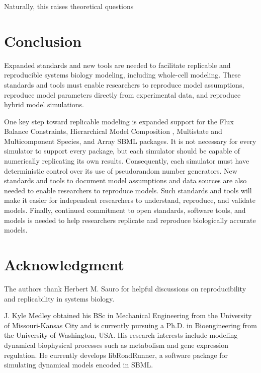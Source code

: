 \documentclass[journal,transmag,twoside]{IEEEtran}
\begin{document}
Naturally, this raises theoretical questions

\section{Conclusion}

Expanded standards and new tools are needed to facilitate replicable and reproducible systems biology modeling, including whole-cell modeling.
These standards and tools must enable researchers to reproduce model assumptions, reproduce model parameters
directly from experimental data, and reproduce hybrid model simulations. 

One key step toward replicable modeling is expanded support for the 
Flux Balance Constraints, Hierarchical Model Composition \cite{smith2015sbml}, Multistate and Multicomponent
Species, and Array SBML packages. It is not necessary for every simulator
to support every package, but each simulator should be capable of numerically replicating its own results.
Consequently, each simulator must have deterministic control over its use of pseudorandom number generators.
New standards and tools to document model assumptions and data sources are also needed to enable researchers to reproduce models.
Such standards and tools will make it easier for independent researchers to understand, reproduce, and validate models. 
Finally, continued commitment to open standards, software tools, and models is needed to help researchers replicate and reproduce biologically accurate models.

\section{Acknowledgment}

The authors thank Herbert M. Sauro for helpful discussions
on reproducibility and replicability in systems biology.

\ifCLASSOPTIONcaptionsoff
  \newpage
\fi




\begin{IEEEbiography}{J. Kyle Medley}
obtained his BSc in Mechanical Engineering from the University of Missouri-Kansas City and
is currently pursuing a Ph.D. in Bioengineering from the University of Washington, USA.
His research interests include modeling dynamical biophysical processes such as
metabolism and gene expression regulation.
He currently develops libRoadRunner, a software package for simulating dynamical models encoded in SBML.
\end{IEEEbiography}
\end{document}
